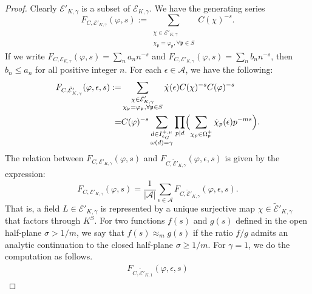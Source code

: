 \documentclass{amsart}
\numberwithin{equation}{section}
\theoremstyle{plain}
\theoremstyle{definition}
\theoremstyle{remark}
\begin{document}
\begin{proof}
	Clearly $\mathcal{E}'_{K,\gamma}$ is a subset of $\mathcal{E}_{K,\gamma}$.
	We have the generating series
	\begin{equation*}
		F_{C,\mathcal{E}'_{K,\gamma}}(\varphi,s):=
		\sum_{
			\substack{
				\chi\in\mathcal{E}'_{K,\gamma}\\
				\chi_{\mathfrak{p}}=\varphi_{\mathfrak{p}},\forall\mathfrak{p}\in S
			}
		}C(\chi)^{-s}.
	\end{equation*}
	If we write $F_{C,\mathcal{E}_{K,\gamma}}(\varphi,s)=\sum_n a_n n^{-s}$ and $F_{C,\mathcal{E}'_{K,\gamma}}(\varphi,s)=\sum_n b_n n^{-s}$, then $b_n\leq a_n$ for all positive integer $n$.
	For each $\epsilon\in\mathcal{A}$, we have the following:
	\begin{equation*}
		\begin{aligned}
			F_{C,\tilde{\mathcal{E}}'_{K,\gamma}}(\varphi,\epsilon,s):=
			&\sum_{
			    \substack{
				\chi\in\tilde{\mathcal{E}}'_{K,\gamma}\\
				\chi_{\mathfrak{p}}=\varphi_{\mathfrak{p}},\forall\mathfrak{p}\in S
			    }
		    }\dot{\chi}(\epsilon)C(\chi)^{-s}C(\varphi)^{-s}
			\\
                =&C(\varphi)^{-s}\sum_{
				\substack{
					d\in I^{+,\mu}_{e_G}\\
					\omega(d)=\gamma
				}
			}
			\prod_{p\mid d}\Bigl(\sum_{\chi_p\in\Omega_p^+}\dot{\chi}_p(\epsilon)p^{-ms}\Bigr).
		\end{aligned}
	\end{equation*}
    The relation between $F_{C,\mathcal{E}'_{K,\gamma}}(\varphi,s)$ and $F_{C,\tilde{\mathcal{E}}'_{K,\gamma}}(\varphi,\epsilon,s)$ is given by the expression:
    \begin{equation*}
        F_{C,\mathcal{E}'_{K,\gamma}}(\varphi,s)=\frac{1}{\lvert\mathcal{A}\rvert}\sum_{\epsilon\in\mathcal{A}}F_{C,\tilde{\mathcal{E}}'_{K,\gamma}}(\varphi,\epsilon,s).
    \end{equation*}
    That is, a field $L\in\mathcal{E}'_{K,\gamma}$ is represented by a unique surjective map $\chi\in\tilde{\mathcal{E}}'_{K,\gamma}$ that factors through $K^S$.
	For two functions $f(s)$ and $g(s)$ defined in the open half-plane $\sigma>1/m$, we say that $f(s)\approx_m g(s)$ if the ratio $f/g$ admits an analytic continuation to the closed half-plane $\sigma\geq1/m$.
    For $\gamma=1$, we do the computation as follows.
    \begin{equation*}
        \begin{aligned}
            F_{C,\tilde{\mathcal{E}}'_{K,1}}(\varphi,\epsilon,s)

\end{aligned}
\end{equation*}
\end{proof}
\end{document}
